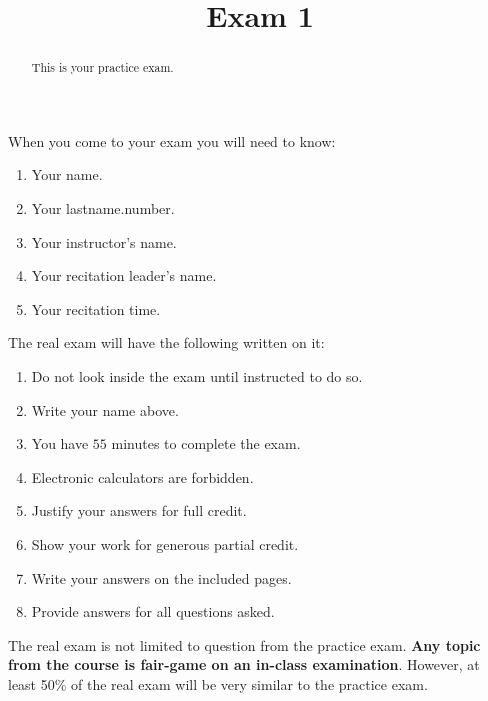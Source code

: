 \documentclass{ximera}
\title{Exam 1}
\begin{document}
\begin{abstract}
This is your practice exam.
\end{abstract}
\maketitle

When you come to your exam you will need to know:
\begin{enumerate}
\item Your name.
\item Your lastname.number.
\item Your instructor's name.
\item Your recitation leader's name.
\item Your recitation time.
\end{enumerate}


The real exam will have the following written on it:

\begin{enumerate}
\item Do not look inside the exam until instructed to do so.
\item Write your name above.
\item You have $55$ minutes to complete the exam.
\item Electronic calculators are forbidden.
\item Justify your answers for full credit.
\item Show your work for generous partial credit.
\item Write your answers on the included pages.
\item Provide answers for all questions asked.
\end{enumerate}

The real exam is not limited to question from the practice
exam. \textbf{Any topic from the course is fair-game on an in-class
  examination}.  However, at least 50\% of the real exam will be very
similar to the practice exam.
\end{document}
